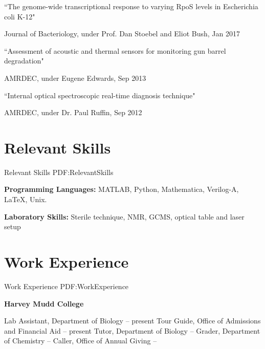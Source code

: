 \documentclass[letterpaper,10pt,oneside]{article}
\begin{document}
\begin{body}
\BulletItemBullet
``The genome-wide transcriptional response to varying RpoS levels in Escherichia coli K-12"
\begin{detail}
\SubBulletItem
Journal of Bacteriology, under Prof. Dan Stoebel and Eliot Bush, Jan 2017
\end{detail}

\Gap

\BulletItemBullet
``Assessment of acoustic and thermal sensors for monitoring gun barrel degradation"
\begin{detail}
\SubBulletItem
AMRDEC, under Eugene Edwards, Sep 2013
\end{detail}

\Gap

\BulletItemBullet
``Internal optical spectroscopic real-time diagnosis technique"
\begin{detail}
\SubBulletItem
AMRDEC, under Dr. Paul Ruffin, Sep 2012
\end{detail}


\section
{Relevant Skills}
{Relevant Skills}
{PDF:RelevantSkills}

{\textbf{Programming Languages:}}
MATLAB, Python, Mathematica, Verilog-A, \LaTeX, Unix.

\Gap

{\textbf{Laboratory Skills:}}
Sterile technique, NMR, GCMS, optical table and laser setup


\section
{Work Experience}
{Work Experience}
{PDF:WorkExperience}

{\textbf{Harvey Mudd College}}

\GapNoBreak
\BulletItem
Lab Assistant, Department of Biology \hfill
{} --
present
\BulletItem
Tour Guide, Office of Admissions and Financial Aid \hfill
{} --
present
\BulletItem
Tutor, Department of Biology \hfill
{} --
\BulletItem
Grader, Department of Chemistry \hfill
{} --
\BulletItem
Caller, Office of Annual Giving \hfill
{} --


\end{body}
\end{document}
